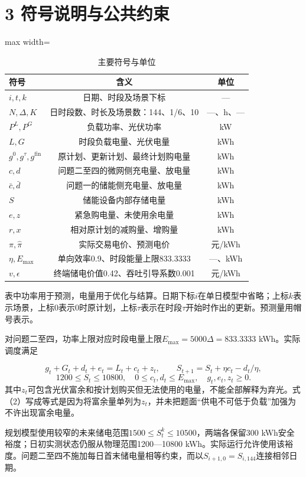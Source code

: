 \documentclass[UTF8,a4paper,zihao=-4,fontset=windows]{ctexart}
\begin{document}
\section{3 符号说明与公共约束}
\begin{table}[H]\centering
\fontsize{9.5}{12}\selectfont\setlength{\tabcolsep}{4pt}\renewcommand{\arraystretch}{1.12}
\begin{adjustbox}{max width=\linewidth}\begin{tabular}{lcc}\toprule
\textbf{符号} & \textbf{含义} & \textbf{单位}\\\midrule
$i,t,k$ & 日期、时段及场景下标 & —\\
$N,\Delta,K$ & 日时段数、时长及场景数：144、1/6、10 & —、h、—\\
$P^L,P^G$ & 负载功率、光伏功率 & kW\\
$L,G$ & 时段负载电量、光伏电量 & kWh\\
$g^0,g^{\tau},g^{\mathrm{fin}}$ & 原计划、更新计划、最终计划购电量 & kWh\\
$c,d$ & 问题二至四的微网侧充电量、放电量 & kWh\\
$\bar c,\bar d$ & 问题一的储能侧充电量、放电量 & kWh\\
$S$ & 储能设备内部存储电量 & kWh\\
$e,z$ & 紧急购电量、未使用余电量 & kWh\\
$r,x$ & 相对原计划的减购量、增购量 & kWh\\
$\pi,\widehat\pi$ & 实际交易电价、预测电价 & 元/kWh\\
$\eta,E_{\max}$ & 单向效率0.9、时段能量上限833.3333 & —、kWh\\
$v,\epsilon$ & 终端储电价值0.42、吞吐引导系数0.001 & 元/kWh\\
\bottomrule\end{tabular}\end{adjustbox}
\caption{主要符号与单位}
\end{table}
表中功率用于预测，电量用于优化与结算。日期下标$i$在单日模型中省略；上标$k$表示场景，上标0表示0时原计划，上标$\tau$表示在时段$\tau$开始时作出的更新。预测量用帽号表示。
\par
对问题二至四，功率上限对应时段电量上限$E_{\max}=5000\Delta=833.3333$ kWh。实际调度满足
\par
\begin{equation}
g_t+G_t+d_t+e_t=L_t+c_t+z_t,\qquad S_{t+1}=S_t+\eta c_t-d_t/\eta, \tag{2}
\end{equation}
\begin{equation}
1200\le S_t\le10800,\quad 0\le c_t,d_t\le E_{\max},\quad g_t,e_t,z_t\ge0. \tag{3}
\end{equation}
其中$z_t$可包含光伏富余和按计划购买但无法使用的电量，不能全部解释为弃光。式（2）写成等式是因为将富余量单列为$z_t$，并未把题面“供电不可低于负载”加强为不许出现富余电量。
\par
规划模型使用较窄的未来储电范围$1500\le S_t^k\le10500$，两端各保留300 kWh安全裕度；日初实测状态仍服从物理范围1200—10800 kWh。实际运行允许使用该裕度。问题二至四不施加每日首末储电量相等约束，而以$S_{i+1,0}=S_{i,144}$连接相邻日期。
\par
\end{document}
